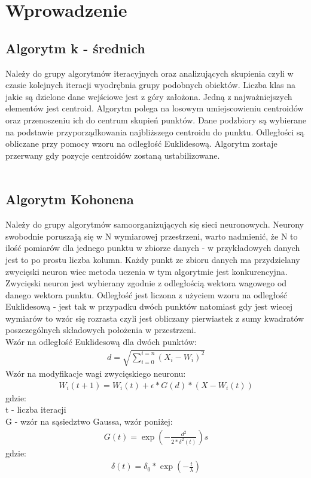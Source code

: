 \documentclass{classrep}
\begin{document}
\section{Wprowadzenie}
{
\subsection{Algorytm k - średnich }
{
Należy do grupy algorytmów iteracyjnych oraz analizujących skupienia czyli w czasie kolejnych iteracji wyodrębnia grupy podobnych obiektów. Liczba klas na jakie są dzielone dane wejściowe jest z góry założona. Jedną z najważniejszych elementów jest centroid. Algorytm polega na losowym umiejscowieniu centroidów oraz przenoszeniu ich do centrum skupień punktów. Dane podzbiory są wybierane na podstawie przyporządkowania najbliższego centroidu do punktu. Odległości są obliczane przy pomocy wzoru na odległość Euklidesową. Algorytm zostaje przerwany gdy pozycje centroidów zostaną ustabilizowane.\\\\
}

\subsection{Algorytm Kohonena}
{
Należy do grupy algorytmów samoorganizujących się sieci neuronowych. Neurony swobodnie poruszają się w N wymiarowej przestrzeni, warto nadmienić, że N to ilość pomiarów dla jednego punktu w zbiorze danych - w przykładowych danych jest to po prostu liczba kolumn. Każdy punkt ze zbioru danych ma przydzielany zwycięski neuron wiec metoda uczenia w tym algorytmie jest konkurencyjna. Zwycięski neuron jest wybierany zgodnie z odległością wektora wagowego od danego wektora punktu. Odległość jest liczona z użyciem wzoru na odległość Euklidesową - jest tak w przypadku dwóch punktów natomiast gdy jest wiecej wymiarów to wzór się rozrasta czyli jest obliczany pierwiastek z sumy kwadratów poszczególnych składowych położenia w przestrzeni. \\

Wzór na odległość Euklidesową dla dwóch punktów: 
\begin{align*}
d=\displaystyle\sqrt{\sum_{i=0}^{i=n} {(X_i - W_i)^2}}
\end{align*}
Wzór na modyfikacje wagi zwycięskiego neuronu: 
\begin{align*}
W_i(t + 1) = W_i(t) + \epsilon * G(d)* (X - W_i(t))
\end{align*}
gdzie:\\
t - liczba iteracji\\
G - wzór na sąsiedztwo Gaussa, wzór poniżej:
\begin{align*}
G(t) = \exp (-\frac{d^2} {2* \delta^2(t)})s
\end{align*}
gdzie:
\begin{align*}
\delta(t) = \delta_0 * \exp (-\frac {t} { \lambda })
\end{align*}
}


}
\end{document}
